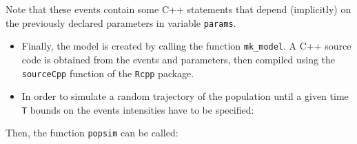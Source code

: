 Note that these events contain some C++ statements that depend (implicitly) on the previously declared parameters in variable \texttt{params}.

\begin{itemize}
\tightlist
\item
  Finally, the model is created by calling the function \texttt{mk\_model}. A C++ source code is obtained from the events and parameters, then compiled using the \texttt{sourceCpp} function of the \texttt{Rcpp} package.
\end{itemize}

\begin{Shaded}
\begin{Highlighting}[]
\StringTok{ }\NormalTok{(} 
                   
\end{Highlighting}
\end{Shaded}

\begin{itemize}
\tightlist
\item
  In order to simulate a random trajectory of the population until a given time \texttt{T} bounds on the events intensities have to be specified:
\end{itemize}

\begin{Shaded}
\begin{Highlighting}[]
\StringTok{ }
\StringTok{ }\NormalTok{(}\NormalTok{ =}\StringTok{ }\OperatorTok{$}\OperatorTok{*}\StringTok{ }\OperatorTok{$}\OperatorTok{*}\StringTok{ }
                  \NormalTok{ =}\StringTok{ }\OperatorTok{$}
\end{Highlighting}
\end{Shaded}

Then, the function \texttt{popsim} can be called:

\begin{Shaded}
\begin{Highlighting}[]
\StringTok{ }
                   \NormalTok{)}
\end{Highlighting}
\end{Shaded}

